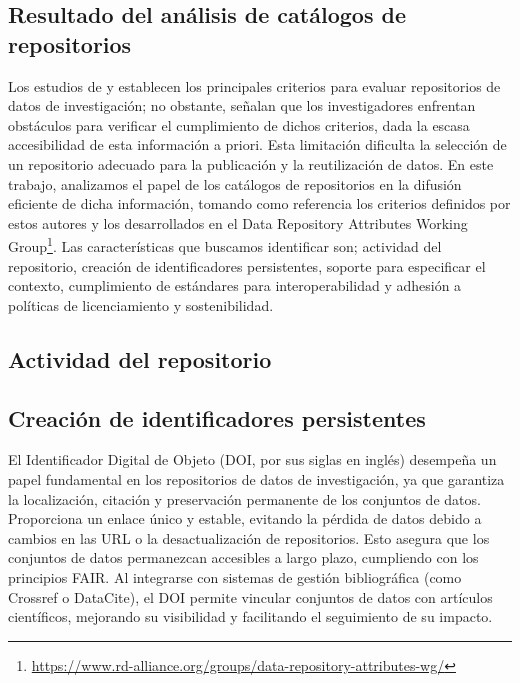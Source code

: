 \documentclass[runningheads]{llncs}
\begin{document}
\subsection{Resultado del análisis de catálogos de repositorios}
Los estudios de \citep{witt_2024_11221855} y \citep{Jia25} establecen los principales criterios para evaluar repositorios de datos de investigación; no obstante, señalan que los investigadores enfrentan obstáculos para verificar el cumplimiento de dichos criterios, dada la escasa accesibilidad de esta información a priori. Esta limitación dificulta la selección de un repositorio adecuado para la publicación y la reutilización de datos. En este trabajo, analizamos el papel de los catálogos de repositorios en la difusión eficiente de dicha información, tomando como referencia los criterios definidos por estos autores y los desarrollados en el Data Repository Attributes Working Group\footnote{\url{https://www.rd-alliance.org/groups/data-repository-attributes-wg/}}.
Las características que buscamos identificar son; actividad del repositorio, creación de identificadores persistentes, soporte para especificar el contexto, cumplimiento de estándares para interoperabilidad y adhesión a políticas de licenciamiento y sostenibilidad.

\subsection*{Actividad del repositorio}

\subsection*{Creación de identificadores persistentes} 

El Identificador Digital de Objeto (DOI, por sus siglas en inglés) desempeña un papel fundamental en los repositorios de datos de investigación, ya que garantiza la localización, citación y preservación permanente de los conjuntos de datos. Proporciona un enlace único y estable, evitando la pérdida de datos debido a cambios en las URL o la desactualización de repositorios. Esto asegura que los conjuntos de datos permanezcan accesibles a largo plazo, cumpliendo con los principios FAIR. Al integrarse con sistemas de gestión bibliográfica (como Crossref o DataCite), el DOI permite vincular conjuntos de datos con artículos científicos, mejorando su visibilidad y facilitando el seguimiento de su impacto.
\end{document}
